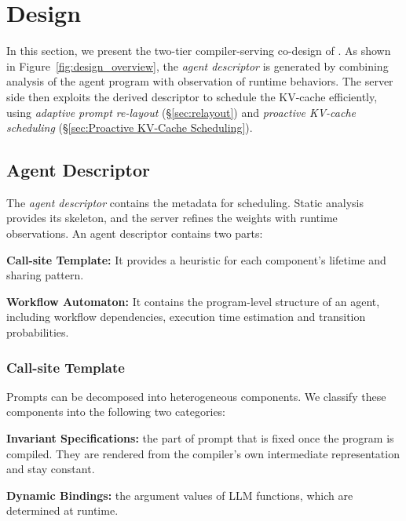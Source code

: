 
\section{Design}


\label{sec:design}
In this section, we present the two-tier compiler-serving co-design of \sysname. As shown in Figure~\ref{fig:design_overview}, the \emph{agent descriptor} is generated by combining analysis of the agent program with observation of runtime behaviors. The server side then exploits the derived descriptor to schedule the KV-cache efficiently, using \emph{adaptive prompt re-layout} (\S\ref{sec:relayout}) and \emph{proactive KV-cache scheduling} (\S\ref{sec:Proactive KV-Cache Scheduling}).


\subsection{Agent Descriptor}
The \emph{agent descriptor} contains the metadata for scheduling. Static analysis provides its skeleton, and the server refines the weights with runtime observations. An agent descriptor contains two parts: 
\begin{enumerate*}[label=(\roman*)]
    \item \textbf{Call-site Template:} It provides a heuristic for each component's lifetime and sharing pattern.
    \item \textbf{Workflow Automaton:} It contains the program-level structure of an agent, including workflow dependencies, execution time estimation and transition probabilities.
\end{enumerate*} 

\subsubsection{Call-site Template}
\label{sec:template}
Prompts can be decomposed into heterogeneous components. We classify these components into the following two categories:
\begin{enumerate*}[label=(\roman*)]
    \item \textbf{Invariant Specifications:} the part of prompt that is fixed once the program is compiled. They are rendered from the compiler's own intermediate representation and stay constant.
    \item \textbf{Dynamic Bindings:} the argument values of LLM functions, which are determined at runtime.
\end{enumerate*}


